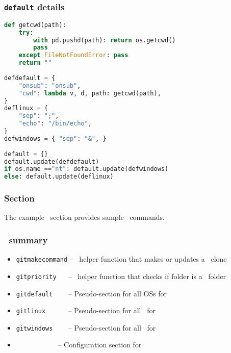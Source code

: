 \subsubsection*{\lstinline{default} details}

\begin{snugshade}
\begin{lstlisting}[language=python]
def getcwd(path):
	try:
		with pd.pushd(path): return os.getcwd()
		pass
	except FileNotFoundError: pass
	return ""
	
defdefault = {
	"onsub": "onsub",
	"cwd": lambda v, d, path: getcwd(path),
}
deflinux = {
	"sep": ";",
	"echo": "/bin/echo",
}
defwindows = { "sep": "&", }
	
default = {}
default.update(defdefault)
if os.name =="nt": default.update(defwindows)
else: default.update(deflinux)
\end{lstlisting}
\end{snugshade}

\subsubsection{Section \git}
The example \git\ section provides sample \git\ commands.

\subsubsection*{\git\ summary}

\begin{itemize}
\item \lstinline{gitmakecommand} -- \Python\ helper function that makes or updates a \git\ clone
\item \lstinline{gitpriority} ~~ -- \Python\ helper function that checks if folder is a \git\ folder
\item \lstinline{gitdefault} ~~~ -- Pseudo-section for all OSs for \git
\item \lstinline{gitlinux} ~~~~~ -- Pseudo-section for all \Linux\ for \git
\item \lstinline{gitwindows} ~~~ -- Pseudo-section for all \Windows\ for \git
\item \git\ ~~~~~~~~~~ -- Configuration section for \git
\end{itemize}

\subsubsection*{\git\ \Linux}

